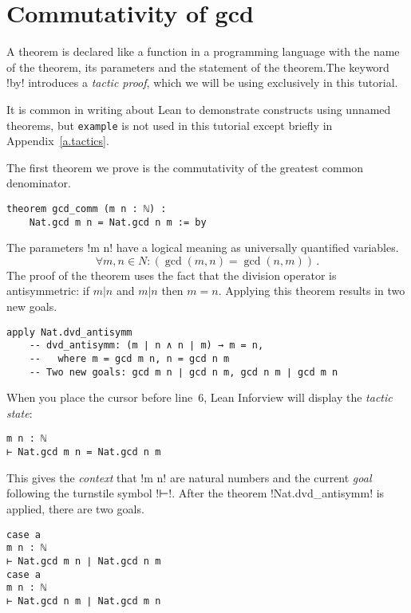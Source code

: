 
\section{Commutativity of gcd}


A theorem is declared like a function in a programming language with the name of the theorem, its parameters and the statement of the theorem.The keyword !by! introduces a \emph{tactic proof}, which we will be using exclusively in this tutorial.

It is common in writing about Lean to demonstrate constructs using unnamed  theorems, but \Verb+example+ is not used in this tutorial except briefly in  Appendix~\ref{a.tactics}.

The first theorem we prove is the commutativity of the greatest common denominator.
\begin{Verbatim}
theorem gcd_comm (m n : ℕ) :
    Nat.gcd m n = Nat.gcd n m := by
\end{Verbatim}

The parameters !m n! have a logical meaning as universally quantified variables.
\[
\forall m, n \in N : (\gcd (m,n) = \gcd (n,m))\,.
\]
The proof of the theorem uses the fact that the division operator is antisymmetric: if $m | n$ and $m | n$ then $m=n$. Applying this theorem results in two new goals.
\begin{Verbatim}[firstnumber=last]
  apply Nat.dvd_antisymm
    -- dvd_antisymm: (m ∣ n ∧ n ∣ m) → m = n,
    --   where m = gcd m n, n = gcd n m
    -- Two new goals: gcd m n ∣ gcd n m, gcd n m ∣ gcd m n
\end{Verbatim}

When you place the cursor before line~6, Lean Inforview will display the \emph{tactic state}:
\begin{Verbatim}[numbers=none]
m n : ℕ
⊢ Nat.gcd m n = Nat.gcd n m
\end{Verbatim}
This gives the \emph{context} that !m n! are natural numbers and the current \emph{goal} following the turnstile symbol !⊢!. After the theorem !Nat.dvd_antisymm! is applied, there are two goals.
\begin{Verbatim}[numbers=none]
case a
m n : ℕ
⊢ Nat.gcd m n ∣ Nat.gcd n m
case a
m n : ℕ
⊢ Nat.gcd n m ∣ Nat.gcd m n
\end{Verbatim}


